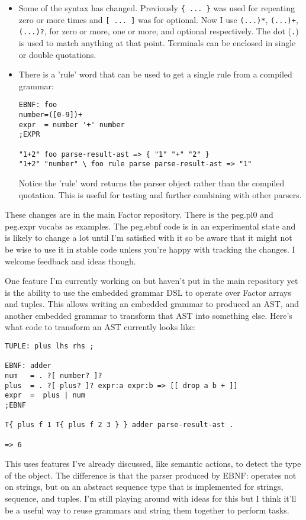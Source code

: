 \begin{itemize}
\item Some of the syntax has changed. Previously \texttt{\{ ... \}}
  was used for repeating zero or more times and \texttt{[ ... ]} was
  for optional. Now I use \texttt{(...)*}, \texttt{(...)+},
  \texttt{(...)?}, for zero or more, one or more, and optional
  respectively. The dot (\texttt{.}) is used to match anything at that
  point. Terminals can be enclosed in single or double quotations.

\item There is a 'rule' word that can be used to get a single rule
  from a compiled grammar:
\begin{verbatim}
EBNF: foo
number=([0-9])+
expr  = number '+' number
;EXPR

"1+2" foo parse-result-ast => { "1" "+" "2" }
"1+2" "number" \ foo rule parse parse-result-ast => "1"
\end{verbatim}

      Notice the 'rule' word returns the parser object rather than the
      compiled quotation. This is useful for testing and further
      combining with other parsers.
\end{itemize}

These changes are in the main Factor repository. There is the peg.pl0
and peg.expr vocabs as examples. The peg.ebnf code is in an
experimental state and is likely to change a lot until I'm satisfied
with it so be aware that it might not be wise to use it in stable code
unless you're happy with tracking the changes. I welcome feedback and
ideas though.

One feature I'm currently working on but haven't put in the main
repository yet is the ability to use the embedded grammar DSL to
operate over Factor arrays and tuples. This allows writing an embedded
grammar to produced an AST, and another embedded grammar to transform
that AST into something else. Here's what code to transform an AST
currently looks like:

\begin{verbatim}
TUPLE: plus lhs rhs ;

EBNF: adder
num   = . ?[ number? ]? 
plus  = . ?[ plus? ]? expr:a expr:b => [[ drop a b + ]]
expr  =  plus | num
;EBNF

T{ plus f 1 T{ plus f 2 3 } } adder parse-result-ast .

=> 6
\end{verbatim}

This uses features I've already discussed, like semantic actions, to
detect the type of the object. The difference is that the parser
produced by EBNF: operates not on strings, but on an abstract sequence
type that is implemented for strings, sequence, and tuples. I'm still
playing around with ideas for this but I think it'll be a useful way
to reuse grammars and string them together to perform tasks.
